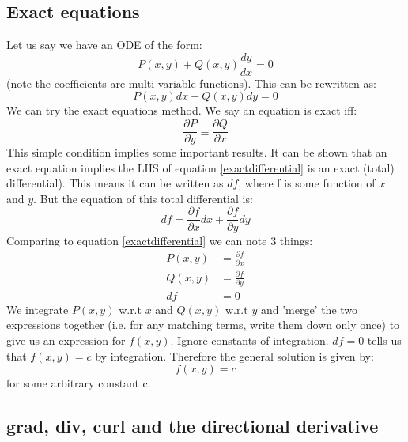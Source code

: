 \documentclass{scrartcl}
\begin{document}
\subsection{Exact equations}
Let us say we have an ODE of the form:
\begin{equation}
P(x, y) + Q(x, y)\frac{dy}{dx} = 0
\end{equation}
(note the coefficients are multi-variable functions). This can be rewritten as:
\begin{equation} \label{exactdifferential}
P(x, y) dx + Q(x, y) dy = 0
\end{equation}
We can try the exact equations method. We say an equation is exact iff:
\begin{equation}
\frac{\partial P}{\partial y} \equiv \frac{\partial Q}{\partial x} 
\end{equation}
This simple condition implies some important results. It can be shown that an exact equation implies the LHS of equation \ref{exactdifferential} is an exact (total) differential). This means it can be written as $ df $, where f is some function of $ x $ and $ y $. But the equation of this total differential is:
\begin{equation}
df = \frac{\partial f}{\partial x}dx + \frac{\partial f}{\partial y}dy
\end{equation}
Comparing to equation \ref{exactdifferential} we can note 3 things:
\begin{equation}
\begin{split}
P(x, y) & = \frac{\partial f}{\partial x} \\
Q(x, y) & = \frac{\partial f}{\partial y} \\
df & = 0
\end{split}
\end{equation}
We integrate $ P(x, y) $ w.r.t $ x $ and $ Q(x, y) $ w.r.t $ y $ and 'merge' the two expressions together (i.e. for any matching terms, write them down only once) to give us an expression for $ f(x, y) $. Ignore constants of integration. $ df = 0 $ tells us that $ f(x, y) = c $ by integration. Therefore the general solution is given by:
\begin{equation}
f(x, y) = c
\end{equation}
for some arbitrary constant c.

\subsection{grad, div, curl and the directional derivative}
\end{document}
